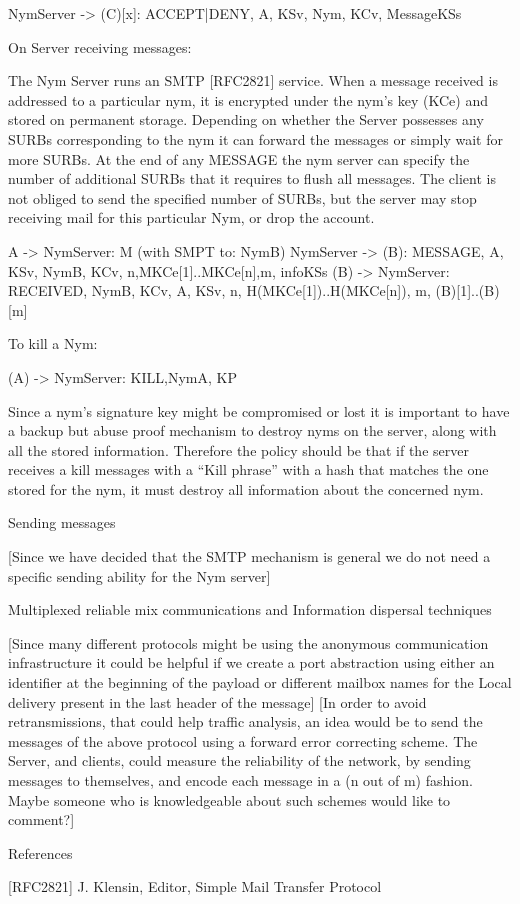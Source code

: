NymServer -> (C)[x]: {ACCEPT|DENY, A, KSv, Nym, KCv, Message}KSs

On Server receiving messages:

The Nym Server runs an SMTP [RFC2821] service. When a message
received is addressed to a particular nym, it is encrypted under the
nym's key (KCe) and stored on permanent storage. Depending on whether
the Server possesses any SURBs corresponding to the nym it can forward
the messages or simply wait for more SURBs. At the end of any MESSAGE
the nym server can specify the number of additional SURBs that it
requires to flush all messages. The client is not obliged to send the
specified number of SURBs, but the server may stop receiving mail for
this particular Nym, or drop the account.

A -> NymServer: M (with SMPT to: NymB)
NymServer -> (B): {MESSAGE, A, KSv, NymB, KCv,
                   n,{M}KCe[1]..{M}KCe[n],m, info}KSs
(B) -> NymServer: {RECEIVED,  NymB, KCv, A, KSv, n,
                   H({M}KCe[1])..H({M}KCe[n]), m, (B)[1]..(B)[m]}

To kill a Nym:

(A) -> NymServer: KILL,NymA, KP

Since a nym's signature key might be compromised or lost it is
important to have a backup but abuse proof mechanism to destroy nyms
on the server, along with all the stored information. Therefore the
policy should be that if the server receives a kill messages with a
``Kill phrase'' with a hash that matches the one stored for the nym,
it must destroy all information about the concerned nym.

Sending messages

[Since we have decided that the SMTP mechanism is general we do not
  need a specific sending ability for the Nym server]

Multiplexed reliable mix communications and Information dispersal techniques

[Since many different protocols might be using the anonymous
  communication infrastructure it could be helpful if we create a port
  abstraction using either an identifier at the beginning of the
  payload or different mailbox names for the Local delivery present in
  the last header of the message] 
[In order to avoid retransmissions, that could help traffic analysis,
  an idea would be to send the messages of the above protocol using a
  forward error correcting scheme. The Server, and clients, could
  measure the reliability of the network, by sending messages to
  themselves, and encode each message in a (n out of m) fashion. Maybe
  someone who is knowledgeable about such schemes would like to comment?]

References

[RFC2821] J. Klensin, Editor, Simple Mail Transfer Protocol
